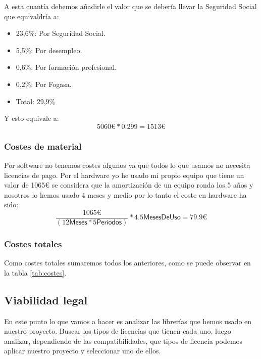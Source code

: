 A esta cuantía debemos añadirle el valor que se debería llevar la Seguridad Social que equivaldría a:
\begin{itemize}
\item 23,6\%: Por Seguridad Social.
\item 5,5\%: Por desempleo.
\item 0,6\%: Por formación profesional.
\item 0,2\%: Por Fogasa.
\item Total: 29,9\% 
\end{itemize}
Y esto equivale a: 
\[5060\euro{}*0.299=1513\euro{}\]
\subsubsection{Costes de material}
Por software no tenemos costes algunos ya que todos lo que usamos no necesita licencias de pago.
Por el hardware yo he usado mi propio equipo que tiene un valor de 1065\euro{} se considera que la amortización de un equipo ronda los 5 años y nosotros lo hemos usado 4 meses y medio por lo tanto el coste en hardware ha sido: 
\[\frac{1065\euro{}}{(12\textsf{Meses}*5\textsf{Periodos})}*4.5\textsf{MesesDeUso}=79.9\euro{}\]
\subsubsection{Costes totales}
Como costes totales sumaremos todos los anteriores, como se puede observar en la tabla \ref{tab:costes}.

\begin{table}[]
\centering
\caption{Tabla de los costes totales}
\label{tab:costes}
\end{table}

\subsection{Viabilidad legal}
En este punto lo que vamos a hacer es analizar las librerías que hemos usado en nuestro proyecto. Buscar los tipos de licencias que tienen cada uno, luego analizar, dependiendo de las compatibilidades, que tipos de licencia podemos aplicar nuestro proyecto y seleccionar uno de ellos.


